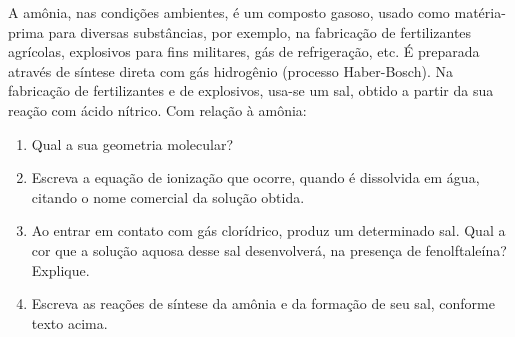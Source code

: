 A amônia, nas condições ambientes, é um composto gasoso, usado como matéria-prima para diversas
substâncias, por exemplo, na fabricação de fertilizantes agrícolas, explosivos para fins militares, gás de
refrigeração, etc.
É preparada através de síntese direta com gás hidrogênio (processo Haber-Bosch).
Na fabricação de fertilizantes e de explosivos, usa-se um sal, obtido a partir da sua reação com ácido nítrico.
Com relação à amônia:

\begin{enumerate}[label = (\alph*)]
	\item Qual a sua geometria molecular?
	\item Escreva a equação de ionização que ocorre, quando é dissolvida em água, citando o nome comercial da solução obtida.
	\item Ao entrar em contato com gás clorídrico, produz um determinado sal. Qual a cor que a solução aquosa desse sal desenvolverá, na presença de fenolftaleína? Explique.
	\item Escreva as reações de síntese da amônia e da formação de seu sal, conforme texto acima.
\end{enumerate}
